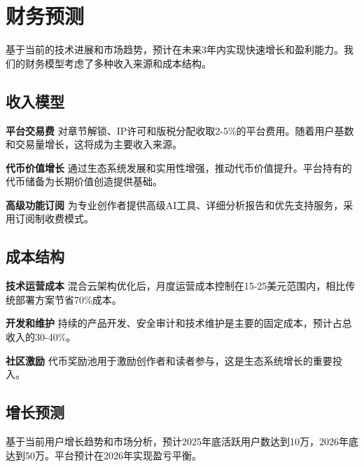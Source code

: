 \section{财务预测}\label{sec:financial-projections-cn}

基于当前的技术进展和市场趋势，\storyhouse{}预计在未来3年内实现快速增长和盈利能力。我们的财务模型考虑了多种收入来源和成本结构。

\subsection{收入模型}

\textbf{平台交易费}
对章节解锁、IP许可和版税分配收取2-5\%的平台费用。随着用户基数和交易量增长，这将成为主要收入来源。

\textbf{\tip{}代币价值增长}
通过生态系统发展和实用性增强，推动\tip{}代币价值提升。平台持有的代币储备为长期价值创造提供基础。

\textbf{高级功能订阅}
为专业创作者提供高级AI工具、详细分析报告和优先支持服务，采用订阅制收费模式。

\subsection{成本结构}

\textbf{技术运营成本}
混合云架构优化后，月度运营成本控制在15-25美元范围内，相比传统部署方案节省70\%成本。

\textbf{开发和维护}
持续的产品开发、安全审计和技术维护是主要的固定成本，预计占总收入的30-40\%。

\textbf{社区激励}
\tip{}代币奖励池用于激励创作者和读者参与，这是生态系统增长的重要投入。

\subsection{增长预测}

基于当前用户增长趋势和市场分析，预计2025年底活跃用户数达到10万，2026年底达到50万。平台预计在2026年实现盈亏平衡。